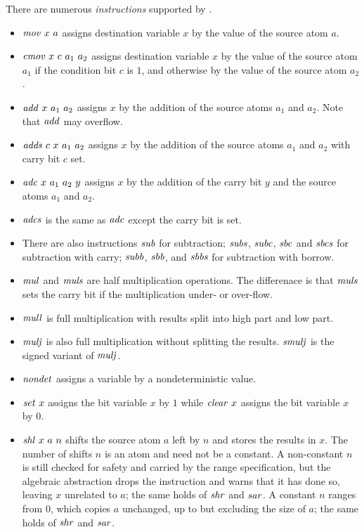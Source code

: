 \documentclass{article}
\begin{document}
There are numerous \emph{instructions} supported by \cryptoline.
\begin{itemize}
\item $\mathit{mov}\ x\ a$ assigns destination variable $x$ by the value of
  the source atom $a$.
\item $\mathit{cmov}\ x\ c\ a_1\ a_2$ assigns destination variable $x$ by the
  value of the source atom $a_1$ if the condition bit $c$ is $1$, and
  otherwise by the value of the source atom $a_2$.
\item $\mathit{add}\ x\ a_1\ a_2$ assigns $x$ by the addition of the source
  atoms $a_1$ and $a_2$.
  Note that $\mathit{add}$ may overflow.
\item $\mathit{adds}\ c\ x\ a_1\ a_2$ assigns $x$ by the addition of the
  source atoms $a_1$ and $a_2$ with carry bit $c$ set.
\item $\mathit{adc}\ x\ a_1\ a_2\ y$ assigns $x$ by the addition of the carry
  bit $y$ and the source atoms $a_1$ and $a_2$.
\item $\mathit{adcs}$ is the same as $\mathit{adc}$ except the carry bit is set.
\item There are also instructions $\mathit{sub}$ for subtraction; $\mathit{subs}$, $\mathit{subc}$,
  $\mathit{sbc}$ and $\mathit{sbcs}$ for subtraction with carry; $\mathit{subb}$, $\mathit{sbb}$,
  and $\mathit{sbbs}$ for subtraction with borrow.
\item $\mathit{mul}$ and $\mathit{muls}$ are half multiplication operations.
  The differenace is that $\mathit{muls}$ sets the carry bit if the
  multiplication under- or over-flow.
\item $\mathit{mull}$ is full multiplication with results split into high
  part and low part.
\item $\mathit{mulj}$ is also full multiplication without splitting the
  results. $\mathit{smulj}$ is the signed variant of $\mathit{mulj}$.
\item $\mathit{nondet}$ assigns a variable by a nondeterministic value.
\item $\mathit{set}\ x$ assigns the bit variable $x$ by $1$ while $\mathit{clear}\
  x$ assigns the bit variable $x$ by $0$.
\item $\mathit{shl}\ x\ a\ n$ shifts the source atom $a$ left by $n$ and
  stores the results in $x$.
  The number of shifts $n$ is an atom and need not be a constant.
  A non-constant $n$ is still checked for safety and carried by the
  range specification, but the algebraic abstraction drops the
  instruction and warns that it has done so, leaving $x$ unrelated to
  $a$; the same holds of $\mathit{shr}$ and $\mathit{sar}$.
  A constant $n$ ranges from $0$, which copies $a$ unchanged, up to but
  excluding the size of $a$; the same holds of $\mathit{shr}$ and $\mathit{sar}$.

\end{itemize}
\end{document}
